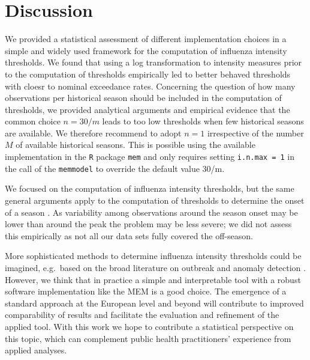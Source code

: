 \documentclass{article}
\begin{document}
\section{Discussion}
\label{sec:discussion}

We provided a statistical assessment of different implementation choices in a simple and widely used framework for the computation of influenza intensity thresholds. We found that using a log transformation to intensity measures prior to the computation of thresholds empirically led to better behaved thresholds with cloesr to nominal exceedance rates. Concerning the question of how many observations per historical season should be included in the computation of thresholds, we provided analytical arguments and empirical evidence that the common choice $n = 30/m$ leads to too low thresholds when few historical seasons are available. We therefore recommend to adopt $n = 1$ irrespective of the number $M$ of available historical seasons. This is possible using the available implementation in the \texttt{R} package \texttt{mem} and only requires setting \texttt{i.n.max = 1} in the call of the \texttt{memmodel} to override the default value 30/m.

We focused on the computation of influenza intensity thresholds, but the same general arguments apply to the computation of thresholds to determine the onset of a season \citep{Vega2012}. As variability among observations around the season onset may be lower than around the peak the problem may be less severe; we did not assess this empirically as not all our data sets fully covered the off-season.

More sophisticated methods to determine influenza intensity thresholds could be imagined, e.g.\ based on the broad literature on outbreak and anomaly detection \citep{Unkel2012}. However, we think that in practice a simple and interpretable tool with a robust software implementation like the MEM is a good choice. The emergence of a standard approach at the European level and beyond will contribute to improved comparability of results and facilitate the evaluation and refinement of the applied tool. With this work we hope to contribute a statistical perspective on this topic, which can complement public health practitioners' experience from applied analyses.





\end{document}
